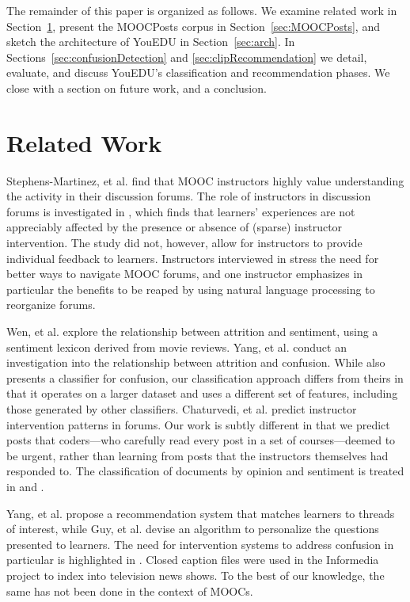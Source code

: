 \documentclass{edm_template}
\begin{document}
The remainder of this paper is organized as follows. We examine
related work in Section~\ref{sec:relWork}, present the MOOCPosts corpus in
Section~\ref{sec:MOOCPosts}, and sketch the architecture of YouEDU in
Section~\ref{sec:arch}.  In Sections~\ref{sec:confusionDetection} and
\ref{sec:clipRecommendation} we detail, evaluate, and discuss YouEDU's 
classification and recommendation phases. We close with a section on
future work, and a conclusion.

\section{Related Work}
\label{sec:relWork}

Stephens-Martinez, et al. \cite{Stephens-Martinez:2014:MMI:2556325.2566246} find that MOOC instructors highly value understanding the activity in their discussion forums. The role of instructors in discussion forums is investigated in \cite{Tomkin:2014:PMU:2556325.2566245}, which finds that learners' experiences are not appreciably affected by the presence or absence of (sparse) instructor intervention. The study did not, however, allow for instructors to provide individual feedback to learners. Instructors interviewed in \cite{hollands2014moocs} stress the need for better ways to navigate MOOC forums, and one instructor emphasizes in particular the benefits to be reaped by using natural language processing to reorganize forums. 

Wen, et al. \cite{wen2014sentiment} explore the relationship between attrition and sentiment, using a sentiment lexicon derived from movie reviews. Yang, et al. \cite{wen2015confusion} conduct an investigation into the relationship between attrition and confusion. While \cite{wen2015confusion} also presents a classifier for confusion, our classification approach differs from theirs in that it operates on a larger dataset and uses a different set of features, including those generated by other classifiers. Chaturvedi, et al. \cite{chaturvedipredicting} predict instructor intervention patterns in forums. Our work is subtly different in that we predict posts that coders---who carefully read every post in a set of courses---deemed to be urgent, rather than learning from posts that the instructors themselves had responded to. The classification of documents by opinion and sentiment is treated in \cite{song2007opinion} and \cite{binali2009new}. 

Yang, et al. \cite{yang2014forum} propose a recommendation system that matches learners to threads of interest, while Guy, et al. \cite{shaniedurank} devise an algorithm to personalize the questions presented to learners. The need for intervention systems to address confusion in particular is highlighted in \cite{wen2015confusion}. Closed caption files were used in the Informedia project \cite{Wactlar:1996:IAD:619007.620445} to index into television news shows. To the best of our knowledge, the same has not been done in the context of MOOCs. 
\end{document}
